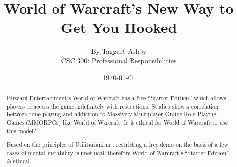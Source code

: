 \documentclass[11pt]{article}
\begin{document}


\title{\vfill World of Warcraft's New Way to Get You Hooked} %
\author{
By Taggart Ashby \vspace{10pt} \\
CSC 300: Professional Responsibilities  \vspace{10pt} \\
}
\date{\today} %

\maketitle


\vfill  %
\begin{abstract}
Blizzard Entertainment's World of Warcraft has a free ``Starter Edition'' which allows players to access the game indefinitely with restrictions. \cite{starterEditionNewsRelease} Studies show a correlation between time playing and addiction to Massively Multiplayer Online Role-Playing Games (MMORPGs) like World of Warcraft. \cite{ProblemUsageAmongHighlyEngagedPlayers}\cite{JustAComputerGameRight} Is it ethical for World of Warcraft to use this model?

Based on the principles of Utilitarianism \cite{Utilitarianism}, restricting a free demo on the basis of a few cases of mental instability is unethical, therefore World of Warcraft's ``Starter Edition'' \emph{is} ethical.
\end{abstract}

\thispagestyle{empty} %
\newpage


\thispagestyle{empty}  %
\tableofcontents
\end{document}
